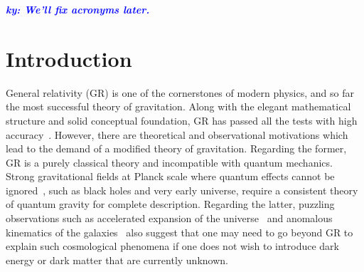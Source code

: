 \documentclass[prd,twocolumn,nofootinbib]{revtex4-1}
\newcommand{\ky}[1]{\textcolor{blue}{\it{\textbf{ky: #1}}} }
\begin{document}
\date{\today}




\maketitle





\ky{We'll fix acronyms later.}


\section{Introduction}
General relativity (GR) is one of the cornerstones of modern physics, and so far the most  successful theory of gravitation. Along with the elegant mathematical structure and solid conceptual foundation, GR has passed all the tests with high accuracy~\cite{Will:2014kxa}. However, there are theoretical and observational motivations which lead to the demand of a modified theory of gravitation. Regarding the former, GR is a purely classical theory and incompatible with quantum mechanics. Strong gravitational fields at Planck scale where quantum effects cannot be ignored~\cite{Adler:2010wf,Ng:2003jk}, such as black holes and very early universe, require a consistent theory of quantum gravity for complete description. Regarding the latter, puzzling observations such as accelerated expansion of the universe~\cite{Abbott:1988nx,Copeland:2006wr,Perlmutter:1998np,Riess:1998cb,Riess:2004nr,RevModPhys.61.1,vanAlbada:1984js,WEINBERG201387} and anomalous kinematics of the galaxies~\cite{article,Bosma:1981zz,Begeman:1991iy,Rubin:1970zza,Rubin:1980zd,1973ApJ...186..467O,Ostriker:1993fr} also suggest that one may need to go beyond GR to explain such cosmological phenomena if one does not wish to introduce dark energy or dark matter that are currently unknown.
\end{document}

